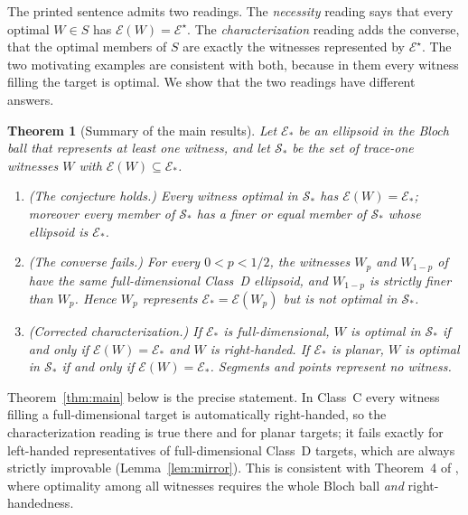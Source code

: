 \documentclass[11pt,a4paper]{article}
\theoremstyle{definition}\newtheorem{definition}[theorem]{Definition}
\newcommand{\E}{\mathcal E}
\newcommand{\Sstar}{\mathcal S_*}
\theoremstyle{plain}\newtheorem*{theorem*}{Theorem}
\begin{document}
The printed sentence admits two readings. The \emph{necessity} reading says that every optimal $W\in S$ has $\E(W)=\E^\star$. The \emph{characterization} reading adds the converse, that the optimal members of $S$ are exactly the witnesses represented by $\E^\star$. The two motivating examples are consistent with both, because in them every witness filling the target is optimal. We show that the two readings have different answers.

\begin{theorem*}[Summary of the main results]
Let $\E_*$ be an ellipsoid in the Bloch ball that represents at least one witness, and let $\Sstar$ be the set of trace-one witnesses $W$ with $\E(W)\subseteq\E_*$.
\begin{enumerate}[label=(\alph*)]
\item \emph{(The conjecture holds.)} Every witness optimal in $\Sstar$ has $\E(W)=\E_*$; moreover every member of $\Sstar$ has a finer or equal member of $\Sstar$ whose ellipsoid is $\E_*$.
\item \emph{(The converse fails.)} For every $0<p<1/2$, the witnesses $W_p$ and $W_{1-p}$ of \cite[Example~2]{milne} have the same full-dimensional Class~D ellipsoid, and $W_{1-p}$ is strictly finer than $W_p$. Hence $W_p$ represents $\E_*=\E(W_p)$ but is not optimal in $\Sstar$.
\item \emph{(Corrected characterization.)} If $\E_*$ is full-dimensional, $W$ is optimal in $\Sstar$ if and only if $\E(W)=\E_*$ and $W$ is right-handed. If $\E_*$ is planar, $W$ is optimal in $\Sstar$ if and only if $\E(W)=\E_*$. Segments and points represent no witness.
\end{enumerate}
\end{theorem*}

Theorem~\ref{thm:main} below is the precise statement. In Class~C every witness filling a full-dimensional target is automatically right-handed, so the characterization reading is true there and for planar targets; it fails exactly for left-handed representatives of full-dimensional Class~D targets, which are always strictly improvable (Lemma~\ref{lem:mirror}). This is consistent with Theorem~4 of \cite{milne}, where optimality among all witnesses requires the whole Bloch ball \emph{and} right-handedness.
\end{document}
